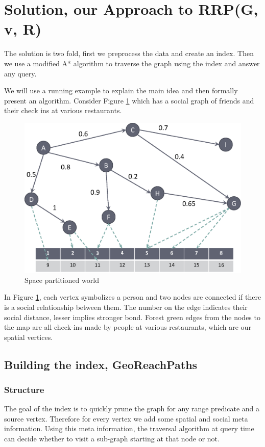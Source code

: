 \section{Solution, our Approach to RRP(G, v, R)}

{The solution is two fold, first we preprocess the data and create an index. Then we use a modified A* algorithm to traverse the graph using the index and answer any query.}

{We will use a running example to explain the main idea and then formally present an algorithm. Consider Figure \ref{fig:space-partitioned} which has a social graph of friends and their check ins at various restaurants.}

\begin{figure}[t]
	\includegraphics[width=0.88\linewidth]{images/space_partitioned_world.eps}
    \caption{Space partitioned world}
    \label{fig:space-partitioned}
\end{figure}

{In Figure \ref{fig:space-partitioned}, each vertex symbolizes a person and two nodes are connected if there is a social relationship between them. The number on the edge indicates their social distance, lesser implies stronger bond. Forest green edges from the nodes to the map are all check-ins made by people at various restaurants, which are our spatial vertices. }

\subsection{Building the index, GeoReachPaths}

\subsubsection{Structure}
The goal of the index is to quickly prune the graph for any range predicate and a source vertex. Therefore for every vertex we add some spatial and social meta information. Using this meta information, the traversal algorithm at query time can decide whether to visit a sub-graph starting at that node or not.

